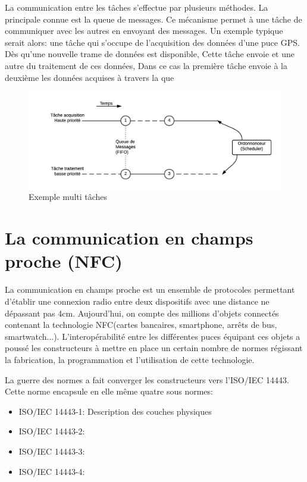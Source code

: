 \documentclass{themeensg}
\begin{document}
La communication entre les tâches s'effectue par plusieurs méthodes. La principale connue est la queue de messages. Ce mécanisme permet à une tâche de communiquer avec les autres en envoyant des messages. Un exemple typique serait alors: une tâche qui s'occupe de l'acquisition des données d'une puce GPS. Dès qu'une nouvelle trame de données est disponible, Cette tâche envoie  et une autre du traitement de ces données, Dans ce cas la première tâche envoie à la deuxième les données acquises à travers la que

\begin{figure}[h!]
\centering
\includegraphics[scale=1]{images/fig2.png}
\caption{Exemple multi tâches}
\label{fig:multitask_ex}
\end{figure}

\section{La communication en champs proche (NFC)}
La communication en champs proche est un ensemble de protocoles permettant d'établir une connexion radio entre deux dispositifs avec une distance ne dépassant pas 4cm. Aujourd'hui, on compte des millions d'objets connectés contenant la technologie NFC(cartes bancaires, smartphone, arrêts de bus, smartwatch...). L'interopérabilité entre les différentes puces équipant ces objets a poussé les constructeurs à mettre en place un certain nombre de normes régissant la fabrication, la programmation et l'utilisation de cette technologie.

La guerre des normes a fait converger les constructeurs vers l'ISO/IEC 14443. Cette norme encapsule en elle même quatre sous normes:

\begin{itemize}
\item ISO/IEC 14443-1: Description des couches physiques
\item ISO/IEC 14443-2: 
\item ISO/IEC 14443-3:
\item ISO/IEC 14443-4: 
\end{itemize}
\end{document}
